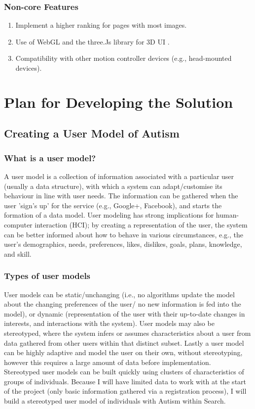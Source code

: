 \documentclass[a4paper, 10pt]{article}
\begin{document}
\subsubsection{Non-core Features}
\begin{enumerate}

\item Implement a higher ranking for pages with most images. 
\item Use of WebGL and the three.Js library for 3D UI .
\item Compatibility with other motion controller devices (e.g., head-mounted devices).

\end{enumerate}

\section{Plan for Developing the Solution}

\subsection {Creating a User Model of Autism}\label{usermodel}
\subsubsection{What is a user model?}
A user model is a collection of information associated with a particular user (usually a data structure), with which a system can adapt/customise its behaviour in line with user needs. The information can be gathered when the user 'sign's up' for the service (e.g., Google+, Facebook), and starts the formation of a data model. User modeling has strong implications for human-computer interaction (HCI); by creating a representation of the user, the system can be better informed about how to behave in various circumstances, e.g., the user’s demographics, needs, preferences, likes, dislikes, goals, plans, knowledge, and skill.

\subsubsection{Types of user models}
User models can be static/unchanging (i.e., no algorithms update the model about the changing preferences of the user/ no new information is fed into the model), or dynamic (representation of the user with their up-to-date changes in interests, and interactions with the system). User models may also be stereotyped, where the system infers or assumes characteristics about a user from data gathered from other users within that distinct subset. Lastly a user model can be highly adaptive and model the user on their own, without stereotyping, however this requires a large amount of data before implementation.\\
Stereotyped user models can be built quickly using clusters of characteristics of groups of individuals. Because I will have limited data to work with at the start of the project (only basic information gathered via a registration process), I will build a stereotyped user model of individuals with Autism within Search.
\end{document}
